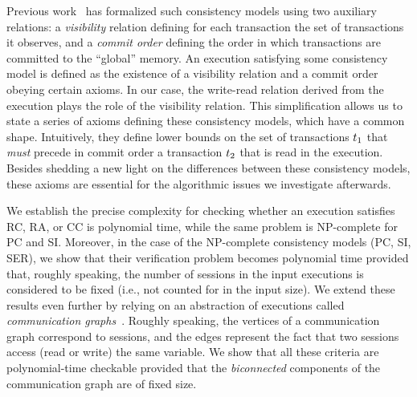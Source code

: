 Previous work~\cite{DBLP:conf/popl/BouajjaniEGH17,DBLP:conf/popl/BurckhardtGYZ14,DBLP:conf/concur/Cerone0G15} has formalized such consistency models using two auxiliary relations: a \emph{visibility} relation defining for each transaction the set of transactions it observes, and a \emph{commit order} defining the order in which transactions are committed to the ``global'' memory. An execution satisfying some consistency model is defined as the existence of a visibility relation and a commit order obeying certain axioms. In our case, the write-read relation derived from the execution plays the role of the visibility relation. This simplification allows us to state a series of axioms defining these consistency models, which have a common shape. Intuitively, they define lower bounds on the set of transactions ${t}_1$ that \emph{must} precede in commit order a transaction ${t}_2$ that is read in the execution. Besides shedding a new light on the differences between these consistency models, these axioms are essential for the algorithmic issues we investigate afterwards.

We establish the precise complexity for checking whether an execution satisfies RC, RA, or CC is polynomial time, while the same problem is NP-complete for PC and SI. Moreover, in the case of the NP-complete consistency models (PC, SI, SER), we show that their verification problem becomes polynomial time provided that, roughly speaking, the number of sessions in the input executions is considered to be fixed (i.e., not counted for in the input size). We extend these results even further by relying on an abstraction of executions called \emph{communication graphs}~\cite{DBLP:journals/pacmpl/ChalupaCPSV18}. Roughly speaking, the vertices of a communication graph correspond to sessions, and the edges represent the fact that two sessions access (read or write) the same variable. We show that all these criteria are polynomial-time checkable provided that the \emph{biconnected} components of the communication graph are of fixed size.

